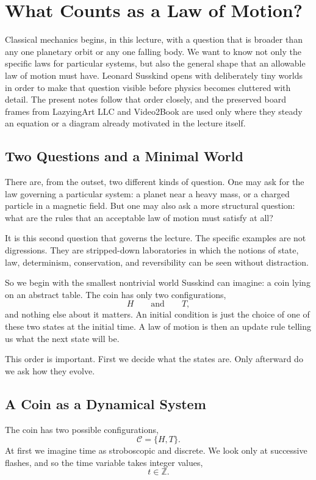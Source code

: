 \chapter{What Counts as a Law of Motion?}

Classical mechanics begins, in this lecture, with a question that is broader than any one planetary orbit or any one falling body. We want to know not only the specific laws for particular systems, but also the general shape that an allowable law of motion must have. Leonard Susskind opens with deliberately tiny worlds in order to make that question visible before physics becomes cluttered with detail. The present notes follow that order closely, and the preserved board frames from LazyingArt LLC and Video2Book are used only where they steady an equation or a diagram already motivated in the lecture itself.

\section{Two Questions and a Minimal World}

There are, from the outset, two different kinds of question. One may ask for the law governing a particular system: a planet near a heavy mass, or a charged particle in a magnetic field. But one may also ask a more structural question: what are the rules that an acceptable law of motion must satisfy at all?

It is this second question that governs the lecture. The specific examples are not digressions. They are stripped-down laboratories in which the notions of state, law, determinism, conservation, and reversibility can be seen without distraction.

So we begin with the smallest nontrivial world Susskind can imagine: a coin lying on an abstract table. The coin has only two configurations,
\[
H \qquad \text{and} \qquad T,
\]
and nothing else about it matters. An initial condition is just the choice of one of these two states at the initial time. A law of motion is then an update rule telling us what the next state will be.

This order is important. First we decide what the states are. Only afterward do we ask how they evolve.

\section{A Coin as a Dynamical System}

The coin has two possible configurations,
\[
\mathcal{C}=\{H,T\}.
\]
At first we imagine time as stroboscopic and discrete. We look only at successive flashes, and so the time variable takes integer values,
\[
t\in \mathbb{Z}.
\]


